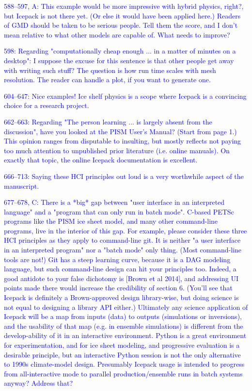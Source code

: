 \documentclass{article}
\theoremstyle{definition}
\theoremstyle{plain}
\begin{document}
\textcolor{blue}{588--597, A:  This example would be more impressive with hybrid physics, right?, but Icepack is not there yet.  (Or else it would have been applied here.)  Readers of GMD should be taken to be serious people.  Tell them the score, and I don't mean relative to what other models are capable of.  What needs to improve?}

\textcolor{blue}{598:  Regarding "computationally cheap enough ... in a matter of minutes on a desktop":  I suppose the excuse for this sentence is that other people get away with writing such stuff?  The question is how run time scales with mesh resolution.  The reader can handle a plot, if you want to generate one.}

\textcolor{blue}{604--647:  Nice examples!  Ice shelf physics is a scope where Icepack is a convincing choice for a research project.}

\textcolor{blue}{662--663:  Regarding "The person learning ... is largely absent from the discussion", have you looked at the PISM User's Manual?  (Start from page 1.)  This opinion ranges from disputable to insulting, but mostly reflects not paying too much attention to unpublished prior literature (i.e. online manuals).  On exactly that topic, the online Icepack documentation is excellent.}

\textcolor{blue}{666--713:  Saying these HCI principles out loud is a very worthwhile aspect of the manuscript.}

\textcolor{blue}{677--678, C:  There is a *big* gap between "user interface in an interpreted language" and a "program that can only run in batch mode".  C-based PETSc programs like the PISM ice sheet model, and many other command-line programs, live in the interior of this gap.  For example, please consider these three HCI principles as they apply to command-line git.  It is neither "a user interface in an interpreted program" nor a "batch mode" only thing.  (Most command-line tools are not!)  Git has a steep learning curve, because it is a DAG modeling language, but such command-line design can hit your principles too.  Indeed, a good antidote to your false dichotomy is [Brown et al 2014], and addressing UI points made there would increase the credibility of section 6.  (You'll see that Icepack is definitely a Brown-approved design library-wise, but doing science is not equal to designing a library API either.)  Ultimately any science application of Icepack will be a map from inputs (data) to outputs (simulations or inversions), and the usability of that map (e.g. in ensemble simulations) is different from the develop-ability of it in an interactive environment.  Python is a great environment for experimentation, and for ice sheet modeling, and progressive evaluation is a desirable principle, but an interactive Python session is not the only alternative to 1990s climate-model design.  Presumably Icepack usage is intended to progress from all-interactive mode to parallel production/ensemble runs in batch systems anyway?  Address that?}
\end{document}
